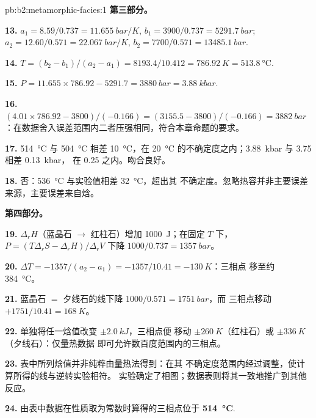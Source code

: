 \begin{solution}{pb:b2:metamorphic-facies:1}
\noindent\textbf{第三部分。}

\textbf{13.} $a_1 = 8.59/0.737 = \qty{11.655}{bar/K}$, $b_1 = 3900/0.737 =
\qty{5291.7}{bar}$; $a_2 = 12.60/0.571 = \qty{22.067}{bar/K}$, $b_2 = 7700/0.571 =
\qty{13485.1}{bar}$.

\textbf{14.} $T = (b_2 - b_1)/(a_2 - a_1) = 8193.4/10.412 = \qty{786.92}{K} =
\qty{513.8}{\celsius}$.

\textbf{15.} $P = 11.655\times786.92 - 5291.7 = \qty{3880}{bar} = \qty{3.88}{kbar}$.

\textbf{16.} $(4.01\times786.92 - 3800)/(-0.166) = (3155.5 - 3800)/(-0.166) =
\qty{3882}{bar}$：在数据舍入误差范围内二者压强相同，符合本章命题的要求。

\textbf{17.} \qty{514}{\celsius} 与 \qty{504}{\celsius} 相差 \qty{10}{\celsius}，在
\qty{20}{\celsius} 的不确定度之内；\qty{3.88}{kbar} 与 3.75 相差 \qty{0.13}{kbar}，
在 0.25 之内。吻合良好。

\textbf{18.} 否：\qty{536}{\celsius} 与实验值相差 \qty{32}{\celsius}，超出其
不确定度。忽略热容并非主要误差来源，主要误差来自焓。

\noindent\textbf{第四部分。}

\textbf{19.} $\Delta_r H$（蓝晶石 $\to$ 红柱石）增加 \qty{1000}{J}；在固定
$T$ 下，$P = (T\Delta_r S - \Delta_r H)/\Delta_r V$ 下降 $1000/0.737 = \qty{1357}{bar}$。

\textbf{20.} $\Delta T = -1357/(a_2 - a_1) = -1357/10.41 = \qty{-130}{K}$：三相点
移至约 \qty{384}{\celsius}。

\textbf{21.} 蓝晶石 $=$ 夕线石的线下降 $1000/0.571 = \qty{1751}{bar}$，而
三相点移动 $+1751/10.41 = \qty{+168}{K}$。

\textbf{22.} 单独将任一焓值改变 $\pm\qty{2.0}{kJ}$，三相点便
移动 $\pm\qty{260}{K}$（红柱石）或 $\pm\qty{336}{K}$（夕线石）：仅量热数据
即可允许数百度范围内的三相点。

\textbf{23.} 表中所列焓值并非纯粹由量热法得到：在其
不确定度范围内经过调整，使计算所得的线与逆转实验相符。
实验确定了相图；数据表则将其一致地推广到其他反应。

\textbf{24.} 由表中数据在性质取为常数时算得的三相点位于
\textbf{\qty[text-series-to-math=true]{514}{\celsius}}.
\end{solution}
